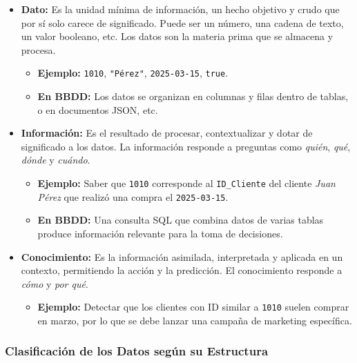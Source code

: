 \documentclass[12pt,a4paper,openany,oneside]{book}
\begin{document}
\begin{itemize}
    \item \textbf{Dato:} Es la unidad mínima de información, un hecho objetivo y crudo que por sí solo carece de significado. Puede ser un número, una cadena de texto, un valor booleano, etc. Los datos son la materia prima que se almacena y procesa.
        \begin{itemize}
            \item \textbf{Ejemplo:} \texttt{1010}, \texttt{"Pérez"}, \texttt{2025-03-15}, \texttt{true}.
            \item \textbf{En BBDD:} Los datos se organizan en columnas y filas dentro de tablas, o en documentos JSON, etc.
        \end{itemize}
    \item \textbf{Información:} Es el resultado de procesar, contextualizar y dotar de significado a los datos. La información responde a preguntas como \textit{quién}, \textit{qué}, \textit{dónde} y \textit{cuándo}.
        \begin{itemize}
            \item \textbf{Ejemplo:} Saber que \texttt{1010} corresponde al \texttt{ID\_Cliente} del cliente \textit{Juan Pérez} que realizó una compra el \texttt{2025-03-15}.
            \item \textbf{En BBDD:} Una consulta SQL que combina datos de varias tablas produce información relevante para la toma de decisiones.
        \end{itemize}
    \item \textbf{Conocimiento:} Es la información asimilada, interpretada y aplicada en un contexto, permitiendo la acción y la predicción. El conocimiento responde a \textit{cómo} y \textit{por qué}.
        \begin{itemize}
            \item \textbf{Ejemplo:} Detectar que los clientes con ID similar a \texttt{1010} suelen comprar en marzo, por lo que se debe lanzar una campaña de marketing específica.
        \end{itemize}
\end{itemize}







\subsubsection{Clasificación de los Datos según su Estructura}
\end{document}

